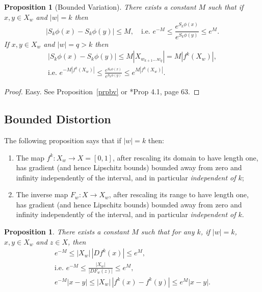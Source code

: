 \documentclass[a4paper]{amsart}
\theoremstyle{plain}
\newtheorem{proposition}[theorem]{Proposition}
\theoremstyle{definition}
\theoremstyle{remark}
\begin{document}
\begin{proposition}[Bounded Variation] \label{PrBV}There exists a constant $ M $ such that if $ x,y\in X_w $ and $ |w|=k $ then  
\begin{equation} \label{rnrf} 
\big|S_k\phi(x) - S_k\phi(y) \big| \leq M, \quad \text{i.e.\  } e^{-M} \leq \frac{e^{S_k\phi(x)}}{e^{S_k\phi(y)}}\leq e^M .
\end{equation} 
If $ x,y\in X_w $ and $ |w|=q>k $ then 
\begin{equation} \label{}
\begin{gathered}
\big|S_k\phi(x) - S_k\phi(y) \big| \leq M |X_{w_{k+1}\dots w_q}| = M\left |f^k(X_w)\right|,\\
\text{i.e.\  } 
e^{-M\left |f^k(X_w)\right|} \leq \frac{e^{S_k\phi(x)}}{e^{S_k\phi(y)}}\leq e^{M \left |f^k(X_w)\right|}.
\end{gathered}
\end{equation}
\end{proposition} 

\begin{proof} Easy.  See Proposition~\ref{prpbv} or \cite{Fal}*{Prop 4.1, page 63}. \end{proof} 

\subsection{Bounded Distortion} 

The following proposition says that if $ |w| = k $ then:
\begin{enumerate}

\item The map $ f^k:X_w \to X=[0,1]  $,  after rescaling its domain to have length one, has gradient (and hence Lipschitz bounds) bounded away from zero and infinity independently of the interval, and in particular \emph{independent of $ k $};
\item The inverse map $ F_w : X \to X_w $, after rescaling its range to have length one, has gradient (and hence Lipschitz bounds) bounded away from zero and infinity independently of the interval, and in particular \emph{independent of $ k $}.
\end{enumerate} 




\begin{proposition}  There exists a constant $ M $ such that for any $ k $, if $ |w|=k $, $ x,y \in X_w $ and $ z \in X $, then
\begin{gather*}
e^{-M} \leq |X_w|\, |Df^k(x)| \leq e^M, \\
\text{i.e.\ } e^{-M} \leq \frac{ |X_w|} {|DF_w(z)|} \leq e^M  , \\
e^{-M}|x-y| \leq |X_w|\,|f^k(x)-f^k(y)|\leq e^M|x-y|.
\end{gather*}
\end{proposition} 
\end{document}
